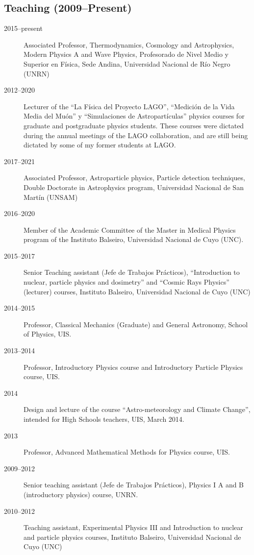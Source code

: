 \subsection*{Teaching (2009--Present)}
\begin{description}
	\item[2015--present] Associated Professor, Thermodynamics, Cosmology and Astrophysics, Modern Physics A and Wave Physics, Profesorado de Nivel Medio y Superior en Física, Sede Andina, Universidad Nacional de Río Negro (UNRN)
	\item [2012--2020] Lecturer of the ``La Física del Proyecto LAGO'', ``Medición de la Vida Media del Muón'' y ``Simulaciones de Astropartículas'' physics courses for graduate and postgraduate physics students.
	These courses were dictated during the annual meetings of the LAGO collaboration, and are still being dictated by some of my former students at LAGO\@.
	\item[2017--2021] Associated Professor, Astroparticle physics, Particle detection techniques, Double Doctorate in Astrophysics program, Universidad Nacional de San Martín (UNSAM)
	\item[2016--2020] Member of the Academic Committee of the Master in Medical Physics program of the Instituto Balseiro, Universidad Nacional de Cuyo (UNC).
	\item[2015--2017] Senior Teaching assistant (Jefe de Trabajos Prácticos), ``Introduction to nuclear, particle physics and dosimetry'' and ``Cosmic Rays Physics'' (lecturer) courses, Instituto Balseiro, Universidad Nacional de Cuyo (UNC)
	\item[2014--2015] Professor, Classical Mechanics (Graduate) and General Astronomy, School of Physics, UIS\@.
	\item[2013--2014] Professor, Introductory Physics course and Introductory Particle Physics course, UIS\@.
	\item[2014] Design and lecture of the course ``Astro-meteorology and Climate Change'', intended for High Schools teachers, UIS, March 2014.
	\item[2013] Professor, Advanced Mathematical Methods for Physics course, UIS\@.
	\item[2009--2012] Senior teaching assistant (Jefe de Trabajos Prácticos), Physics I A and B (introductory physics) course, UNRN\@.
	\item[2010--2012] Teaching assistant, Experimental Physics III and Introduction to nuclear and particle physics courses, Instituto Balseiro, Universidad Nacional de Cuyo (UNC)
\end{description}
\else

